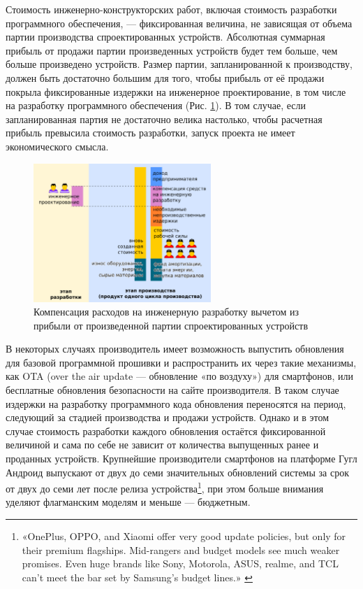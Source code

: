 \documentclass{article}
\begin{document}
Стоимость инженерно-конструкторских работ, включая стоимость разработки программного обеспечения, — фиксированная величина, не зависящая от объема партии производства спроектированных устройств. Абсолютная суммарная прибыль от продажи партии произведенных устройств будет тем больше, чем больше произведено устройств. Размер партии, запланированной к производству, должен быть достаточно большим для того, чтобы прибыль от её продажи покрыла фиксированные издержки на инженерное проектирование, в том числе на разработку программного обеспечения (Рис. \ref{fig:model_hard_soft}). В том случае, если запланированная партия не достаточно велика настолько, чтобы расчетная прибыль превысила стоимость разработки, запуск проекта не имеет экономического смысла.

\begin{figure}[h]
    \centering
    \includegraphics[width=0.60\textwidth]{model-hard-soft}
    \caption{Компенсация расходов на инженерную разработку вычетом из прибыли от произведенной партии спроектированных устройств}
    \label{fig:model_hard_soft}
\end{figure}

В некоторых случаях производитель имеет возможность выпустить обновления для базовой программной прошивки и распространить их через такие механизмы, как OTA (over the air update — обновление «по воздуху») для смартфонов, или бесплатные обновления безопасности на сайте производителя. В таком случае издержки на разработку программного кода обновления переносятся на период, следующий за стадией производства и продажи устройств. Однако и в этом случае стоимость разработки каждого обновления остаётся фиксированной величиной и сама по себе не зависит от количества выпущенных ранее и проданных устройств. Крупнейшие производители смартфонов на платформе Гугл Андроид выпускают от двух до семи значительных обновлений системы за срок от двух до семи лет после релиза устройства\footnote{«OnePlus, OPPO, and Xiaomi offer very good update policies, but only for their premium flagships. Mid-rangers and budget models see much weaker promises. Even huge brands like Sony, Motorola, ASUS, realme, and TCL can’t meet the bar set by Samsung’s budget lines.» \cite{phoneUpdates}}, при этом больше внимания уделяют флагманским моделям и меньше — бюджетным.
\end{document}
